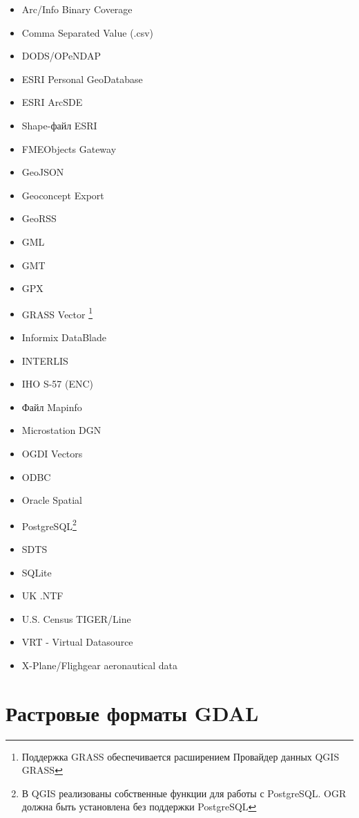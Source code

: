 \begin{itemize}
\item Arc/Info Binary Coverage
\item Comma Separated Value (.csv)
\item DODS/OPeNDAP
\item ESRI Personal GeoDatabase
\item ESRI ArcSDE
\item Shape-файл ESRI
\item FMEObjects Gateway
\item GeoJSON
\item Geoconcept Export
\item GeoRSS
\item GML
\item GMT
\item GPX
\item GRASS Vector \footnote{Поддержка GRASS обеспечивается расширением
Провайдер данных QGIS GRASS}
\item Informix DataBlade
\item INTERLIS
\item IHO S-57 (ENC)
\item Файл Mapinfo %
\item Microstation DGN
\item OGDI Vectors
\item ODBC
\item Oracle Spatial
\item PostgreSQL\footnote{В QGIS реализованы собственные функции для
работы с PostgreSQL. OGR должна быть установлена без поддержки PostgreSQL}
\item SDTS
\item SQLite
\item UK .NTF
\item U.S. Census TIGER/Line
\item VRT - Virtual Datasource
\item X-Plane/Flighgear aeronautical data
\end{itemize}

\section{Растровые форматы GDAL}\label{appdx_gdal}
 

